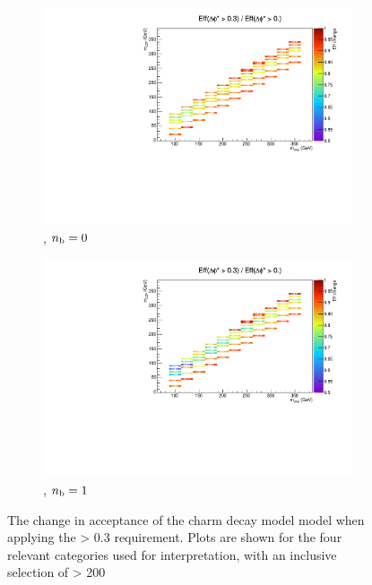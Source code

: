 \begin{figure}[h!]
\begin{subfigure}[b]{0.46\textwidth}
    \includegraphics[width=\textwidth]
    {Figs/sms/t2cc/v37/eff_changes/eff_compare_2d_T2cc_v37_vs_T2cc_v38_eq0b_ge4j}
    \caption{\njhigh, $n_{\text{b}} = 0$}
    \label{fig:t2cc_dphistar_eq0b_ge4j}
  \end{subfigure}
  \begin{subfigure}[b]{0.46\textwidth}
    \includegraphics[width=\textwidth]
    {Figs/sms/t2cc/v37/eff_changes/eff_compare_2d_T2cc_v37_vs_T2cc_v38_eq1b_ge4j}
    \caption{\njhigh, $n_{\text{b}} = 1$}
    \label{fig:t2cc_dphistar_eq1b_ge4j}
  \end{subfigure}
  \caption{The change in acceptance of the charm decay model model when applying
  the \mindphistar > 0.3 requirement. Plots are shown for the four relevant
  categories used for interpretation, with an inclusive selection of \HT >
  200~\gev}
  \label{fig:t2cc_dphistar_effchange}
\end{figure}

